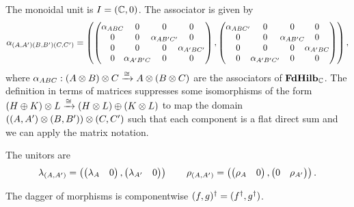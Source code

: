 The monoidal unit is $I = \fermpair{\Cbb}{ 0}$.
%
The associator is given by
\begin{equation}
    \label{eq:topo_data:ferm:associatior}
    \setlength{\arraycolsep}{0mm}
    \alpha_{\fermpair{A}{A'}\fermpair{B}{B'}\fermpair{C}{C'}}
    = \fermpair{
        \begin{pmatrix}
            \alpha_{ABC} & 0 & 0 & 0 \\
            0 & 0 & \alpha_{AB'C'} & 0 \\
            0 & 0 & 0 & \alpha_{A'BC'} \\
            0 & \alpha_{A'B'C} & 0 & 0
        \end{pmatrix}
    }{
        \begin{pmatrix}
            \alpha_{ABC'} & 0 & 0 & 0 \\
            0 & 0 & \alpha_{AB'C} & 0 \\
            0 & 0 & 0 & \alpha_{A'BC} \\
            0 & \alpha_{A'B'C'} & 0 & 0
        \end{pmatrix}
    }
    ,
\end{equation}
where $\alpha_{ABC} : (A \otimes B) \otimes C \xrightarrow{\cong} A \otimes (B \otimes C)$ are the associators of $\mathbf{FdHilb}_{\mathbb{C}}$.
%
The definition in terms of matrices suppresses some isomorphisms of the form $(H \oplus K) \otimes L \xrightarrow{\cong} (H \otimes L) \oplus (K \otimes L)$ to map the domain $(\fermpair{A}{A'} \otimes \fermpair{B}{B'}) \otimes \fermpair{C}{C'}$ such that each component is a flat direct sum and we can apply the matrix notation.

The unitors are
\begin{equation}
    \lambda_{\fermpair{A}{A'}}
    = \fermpair{
        \begin{pmatrix} \lambda_A & 0 \end{pmatrix}
    }{
        \begin{pmatrix} \lambda_{A'} & 0 \end{pmatrix}
    }
    \qquad
    \rho_{\fermpair{A}{A'}}
    = \fermpair{
        \begin{pmatrix} \rho_A & 0 \end{pmatrix}
    }{
        \begin{pmatrix} 0 & \rho_{A'} \end{pmatrix}
    }
    .
\end{equation}

The dagger of morphisms is componentwise $\fermpair{f}{g}^\dagger = \fermpair{f^\dagger}{g^\dagger}$.


